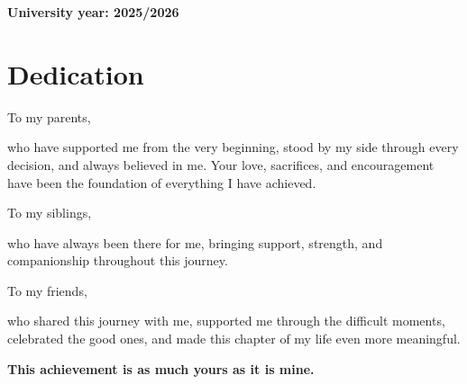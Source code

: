 \documentclass[12pt,a4paper]{report}
\begin{document}
\begin{titlepage}
\begin{center}
    \vspace{1cm}

    
    {\normalsize \textbf{University year: 2025/2026}}\\
\end{center}



\end{titlepage}

\pagestyle{plain} %

\cleardoublepage
\chapter*{Dedication}
\thispagestyle{empty}
\vspace*{2cm}

\begin{center}
\itshape
\setlength{\parskip}{1.2em}
\setlength{\parindent}{0pt}

To my parents,

who have supported me from the very beginning, stood by my side through every decision, and always believed in me. Your love, sacrifices, and encouragement have been the foundation of everything I have achieved.

To my siblings,

who have always been there for me, bringing support, strength, and companionship throughout this journey.

To my friends,

who shared this journey with me, supported me through the difficult moments, celebrated the good ones, and made this chapter of my life even more meaningful.

\textbf{This achievement is as much yours as it is mine.}
\end{center}


\cleardoublepage
\end{document}
